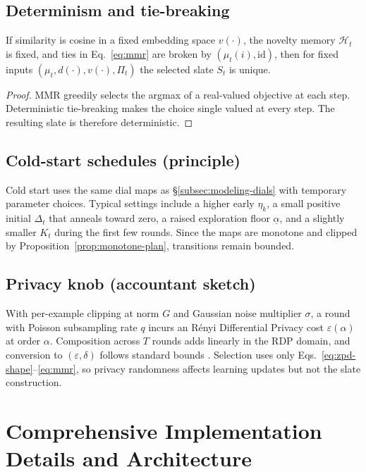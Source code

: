 \subsection{Determinism and tie-breaking}
\begin{lemma}
If similarity is cosine in a fixed embedding space $v(\cdot)$, the novelty memory $\mathcal{H}_t$ is fixed, and ties in Eq.~\eqref{eq:mmr} are broken by $(\mu_t(i),\text{id})$, then for fixed inputs $(\mu_t,d(\cdot),v(\cdot),\Pi_t)$ the selected slate $S_t$ is unique.
\end{lemma}

\begin{proof}
MMR greedily selects the argmax of a real-valued objective at each step. Deterministic tie-breaking makes the choice single valued at every step. The resulting slate is therefore deterministic.
\end{proof}

\subsection{Cold-start schedules (principle)}
Cold start uses the same dial maps as §\ref{subsec:modeling-dials} with temporary parameter choices. Typical settings include a higher early $\eta_k$, a small positive initial $\Delta_t$ that anneals toward zero, a raised exploration floor $\underline{\alpha}$, and a slightly smaller $K_t$ during the first few rounds. Since the maps are monotone and clipped by Proposition~\ref{prop:monotone-plan}, transitions remain bounded.

\subsection{Privacy knob (accountant sketch)}
With per-example clipping at norm $G$ and Gaussian noise multiplier $\sigma$, a round with Poisson subsampling rate $q$ incurs an R\'enyi Differential Privacy cost $\varepsilon(\alpha)$ at order $\alpha$. Composition across $T$ rounds adds linearly in the RDP domain, and conversion to $(\varepsilon,\delta)$ follows standard bounds \cite{Mironov2017RDP,Abadi2016}. Selection uses only Eqs.~\eqref{eq:zpd-shape}–\eqref{eq:mmr}, so privacy randomness affects learning updates but not the slate construction.

\section{Comprehensive Implementation Details and Architecture}
\label{app:implementation}

